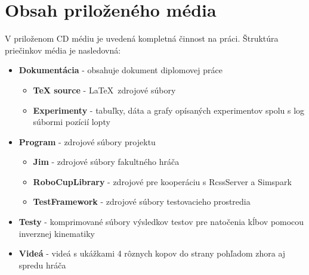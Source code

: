\section{Obsah priloženého média}
	\label{appendix_medium}
	
V priloženom CD médiu je uvedená kompletná činnost na práci.
Štruktúra priečinkov média je nasledovná:

\begin{itemize}
	\item \textbf{Dokumentácia} - obsahuje dokument diplomovej práce
	\begin{itemize}
		\item \textbf{TeX source} - \LaTeX ~zdrojové súbory
		\item \textbf{Experimenty} - tabuľky, dáta a grafy opísaných experimentov spolu s log súbormi pozícií lopty
	\end{itemize}
	\item \textbf{Program} - zdrojové súbory projektu
	\begin{itemize}
		\item \textbf{Jim} - zdrojové súbory fakultného hráča
		\item \textbf{RoboCupLibrary} - zdrojové pre kooperáciu s RcssServer a Simspark
		\item \textbf{TestFramework} - zdrojové súbory testovacieho prostredia
	\end{itemize}
	\item \textbf{Testy} - komprimované súbory výsledkov testov pre natočenia kĺbov pomocou inverznej kinematiky
	\item \textbf{Videá} - videá s ukážkami 4 rôznych kopov do strany pohľadom zhora aj spredu hráča
\end{itemize}